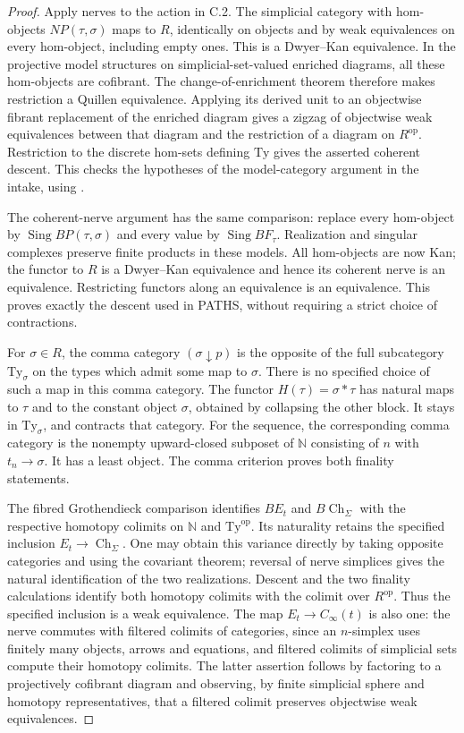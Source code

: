 \begin{proof}
Apply nerves to the action in C.2. The simplicial category with
hom-objects $NP(\tau,\sigma)$ maps to $R$, identically on objects
and by weak equivalences on every hom-object, including empty ones.
This is a Dwyer--Kan equivalence. In the projective model structures
on simplicial-set-valued enriched diagrams, all these hom-objects
are cofibrant. The change-of-enrichment theorem therefore makes
restriction a Quillen equivalence. Applying its derived unit to
an objectwise fibrant replacement of the enriched diagram gives a
zigzag of objectwise weak equivalences between that diagram and the
restriction of a diagram on $R^{\mathrm{op}}$. Restriction to the
discrete hom-sets defining $\mathrm{Ty}$ gives the asserted coherent
descent. This checks the hypotheses of the model-category argument
in the intake, using \cite[Proposition A.3.3.8]{CpathsLurieHTT}.

The coherent-nerve argument has the same comparison: replace every
hom-object by $\operatorname{Sing}BP(\tau,\sigma)$ and every value
by $\operatorname{Sing}BF_\tau$. Realization and singular complexes
preserve finite products in these models. All hom-objects are now
Kan; the functor to $R$ is a Dwyer--Kan equivalence and hence its
coherent nerve is an equivalence. Restricting functors along an
equivalence is an equivalence. This proves exactly the descent used
in PATHS, without requiring a strict choice of contractions.

For $\sigma\in R$, the comma category $(\sigma\downarrow p)$
is the opposite of the full subcategory $\mathrm{Ty}_\sigma$
on the types which admit some map to $\sigma$. There is no specified
choice of such a map in this comma category. The functor
$H(\tau)=\sigma*\tau$ has natural maps to $\tau$ and to the
constant object $\sigma$, obtained by collapsing the other block.
It stays in $\mathrm{Ty}_\sigma$, and contracts that category.
For the sequence, the corresponding comma category is the nonempty
upward-closed subposet of $\mathbb N$ consisting of $n$ with
$t_n\to\sigma$. It has a least object. The comma criterion proves
both finality statements.

The fibred Grothendieck comparison identifies $BE_t$ and
$B\operatorname{Ch}_\Sigma$ with the respective homotopy colimits
on $\mathbb N$ and $\mathrm{Ty}^{\mathrm{op}}$. Its naturality
retains the specified inclusion $E_t\to\operatorname{Ch}_\Sigma$.
One may obtain this variance directly by taking opposite categories
and using the covariant theorem; reversal of nerve simplices gives
the natural identification of the two realizations. Descent and
the two finality calculations identify both homotopy colimits with
the colimit over $R^{\mathrm{op}}$. Thus the specified inclusion is
a weak equivalence. The map $E_t\to C_\infty(t)$ is also one:
the nerve commutes with filtered colimits of categories, since an
$n$-simplex uses finitely many objects, arrows and equations, and
filtered colimits of simplicial sets compute their homotopy colimits.
The latter assertion follows by factoring to a projectively
cofibrant diagram and observing, by finite simplicial sphere and
homotopy representatives, that a filtered colimit preserves
objectwise weak equivalences.


\end{proof}
